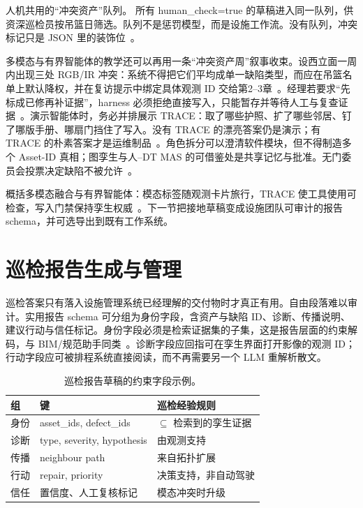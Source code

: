 人机共用的``冲突资产''队列。 所有 human\_check=true 的草稿进入同一队列，供资深巡检员按吊篮日筛选。队列不是惩罚模型，而是设施工作流。没有队列，冲突标记只是 JSON 里的装饰位~\cite{chen2023facility,luo2025llmdtrobot}。




多模态与有界智能体的教学还可以再用一条``冲突资产周''叙事收束。设西立面一周内出现三处 RGB/IR 冲突：系统不得把它们平均成单一缺陷类型，而应在吊篮名单上默认降权，并在复访提示中绑定具体观测 ID 交给第2--3章~\cite{zhao2024facade,zhao2026physical,luo2025llmdtrobot}。经理若要求``先标成已修再补证据''，harness 必须拒绝直接写入，只能暂存并等待人工与复查证据~\cite{gao2026ifcagent,lu2026highwaymas}。演示智能体时，务必并排展示 TRACE：取了哪些护照、扩了哪些邻居、钉了哪版手册、哪扇门挡住了写入。没有 TRACE 的漂亮答案仍是演示；有 TRACE 的朴素答案才是运维制品~\cite{wang2024surveyagents,liang2023helm,hellin2025bimmas}。角色拆分可以澄清软件模块，但不得制造多个 Asset-ID 真相；图孪生与人--DT MAS 的可借鉴处是共享记忆与批准。无门委员会投票决定缺陷不被允许~\cite{pan2026graphdtgpt,lu2026highwaymas,rawat2025llmmas}。



概括多模态融合与有界智能体：模态标签随观测卡片旅行，TRACE 使工具使用可检查，写入门禁保持孪生权威~\cite{zhao2026physical,yao2023react,luo2025llmdtrobot,lu2026highwaymas}。下一节把接地草稿变成设施团队可审计的报告 schema，并可选导出到既有工作系统。

\section{巡检报告生成与管理}
\label{sec:ch8-reports}

巡检答案只有落入设施管理系统已经理解的交付物时才真正有用。自由段落难以审计。实用报告 schema 可分组为身份字段，含资产与缺陷 ID、诊断、传播说明、建议行动与信任标记。身份字段必须是检索证据集的子集，这是报告层面的约束解码，与 BIM/规范助手同类~\cite{zheng2023bimassistant,joffe2025buildingcodes}。诊断字段应回指可在孪生界面打开影像的观测 ID；行动字段应可被排程系统直接阅读，而不再需要另一个 LLM 重解析散文。

\begin{table}[htbp]
\centering
\caption{巡检报告草稿的约束字段示例。}
\label{tab:ch8-schema}
\begin{tabular}{llp{6.0cm}}
\toprule
组 & 键 & 巡检经验规则 \\
\midrule
身份 & asset\_ids, defect\_ids & $\subseteq$ 检索到的孪生证据 \\
诊断 & type, severity, hypothesis & 由观测支持 \\
传播 & neighbour path & 来自拓扑扩展 \\
行动 & repair, priority & 决策支持，非自动驾驶 \\
信任 & 置信度、人工复核标记 & 模态冲突时升级 \\
\bottomrule
\end{tabular}
\end{table}

